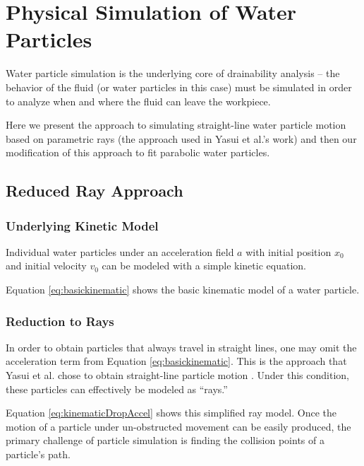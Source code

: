 						\chapter{Physical Simulation of Water Particles}\label{physicalChapter}

Water particle simulation is the underlying core of drainability analysis -- the behavior of the fluid (or water particles in this case) must be simulated in order to analyze when and where the fluid can leave the workpiece.

Here we present the approach to simulating straight-line water particle motion based on parametric rays (the approach used in Yasui et al.'s work) and then our modification of this approach to fit parabolic water particles.

\section{Reduced Ray Approach}\label{KineticEquation}

	\subsection{Underlying Kinetic Model}

Individual water particles under an acceleration field $a$ with initial position $x_0$ and initial velocity $v_0$ can be modeled with a simple kinetic equation.


Equation \eqref{eq:basickinematic} shows the basic kinematic model of a water particle.


	\subsection{Reduction to Rays}

In order to obtain particles that always travel in straight lines, one may omit the acceleration term from Equation \eqref{eq:basickinematic}. This is the approach that Yasui et al. chose to obtain straight-line particle motion \cite{Yasui2011}. Under this condition, these particles can effectively be modeled as ``rays.''


Equation \eqref{eq:kinematicDropAccel} shows this simplified ray model. Once the motion of a particle under un-obstructed movement can be easily produced, the primary challenge of particle simulation is finding the collision points of a particle's path.

